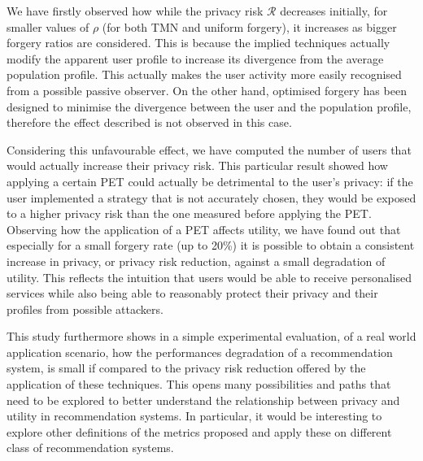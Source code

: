 We have firstly observed how while the privacy risk $\mathcal{R}$  decreases initially, for smaller values of $\rho$ (for both TMN and uniform forgery), it increases as bigger forgery ratios are considered. This is because the implied techniques actually modify the apparent user profile to increase its divergence from the average population profile. This actually makes the user activity more easily recognised from a possible passive observer. On the other hand, optimised forgery has been designed to minimise the divergence between the user and the population profile, therefore the effect described is not observed in this case.

Considering this unfavourable effect, we have computed the number of users that would actually increase their privacy risk. This particular result showed how applying a certain PET could actually be detrimental to the user's privacy: if the user implemented a strategy that is not accurately chosen, they would be exposed to a higher privacy risk than the one measured before applying the PET.
Observing how the application of a PET affects utility, we have found out that especially for a small forgery rate (up to 20\%) it is possible to obtain a consistent increase in privacy, or privacy risk reduction, against a small degradation of utility. This reflects the intuition that users would be able to receive personalised services while also being able to reasonably protect their privacy and their profiles from possible attackers.

This study furthermore shows in a simple experimental evaluation, of a real world application scenario, how the performances degradation of a recommendation system, is small if compared to the privacy risk reduction offered by the application of these techniques. This opens many possibilities and paths that need to be explored to better understand the relationship between privacy and utility in recommendation systems. In particular, it would be interesting to explore other definitions of the metrics proposed and apply these on different class of recommendation systems.
